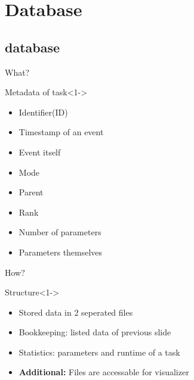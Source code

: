 \section{Database}

\subsection{database}

	\begin{frame}{What?}
		\begin{block}{Metadata of task}<1->{}
		\begin{itemize}
		\item<1->{} {Identifier(ID)}
		\item<2->{} {Timestamp of an event}
		\item<3->{} {Event itself}
		\item<4->{} {Mode}
		\item<5->{} {Parent}
		\item<6->{} {Rank}
		

		\item<7->{} {Number of parameters}
		\item<8->{} {Parameters themselves}
		\end{itemize}
		\end{block}
	\end{frame}
	
	\begin{frame}{How?}
		\begin{block}{Structure}<1->{}
		\begin{itemize}
		\item<1->{} {Stored data in 2 seperated files}
		\item<2->{} {Bookkeeping: listed data of previous slide}
		\item<3->{} {Statistics: parameters and runtime of a task}
		\item<5->{} {\textbf{Additional: }Files are accessable for visualizer}
		\end{itemize}
		\end{block}
	\end{frame}
